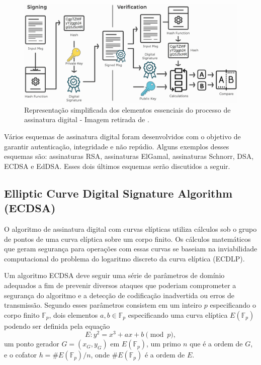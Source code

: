 \begin{figure}[h]
	\centering
	\includegraphics[keepaspectratio=true,scale=0.45]{figuras/assinatura digital.png}
	\caption{Representação simplificada dos elementos essenciais do processo de assinatura digital - Imagem retirada de \cite{nakov2018}.}
	\label{assinaturaDigitalSimp}
\end{figure}

Vários esquemas de assinatura digital foram desenvolvidos com o objetivo de garantir autenticação, integridade e não repúdio. Alguns exemplos desses esquemas são: assinaturas RSA, assinaturas ElGamal, assinaturas Schnorr, DSA, ECDSA e EdDSA. Esses dois últimos esquemas serão discutidos a seguir.

\subsection{Elliptic Curve Digital Signature Algorithm (ECDSA)}

O algoritmo de assinatura digital com curvas elípticas utiliza cálculos sob o grupo de pontos de uma curva elíptica sobre um corpo finito. Os cálculos matemáticos que geram segurança para operações com essas curvas se baseiam na inviabilidade computacional do problema do logaritmo discreto da curva elíptica (ECDLP).

Um algoritmo ECDSA deve seguir uma série de parâmetros de domínio adequados a fim de prevenir diversos ataques que poderiam comprometer a segurança do algoritmo e a detecção de codificação inadvertida ou erros de transmissão. Segundo  esses parâmetros consistem em um inteiro $p$ especificando o corpo finito $\mathbb{F}_p$, dois elementos $a, b \in \mathbb{F}_p $ especificando uma curva elíptica $E(\mathbb{F}_p)$ podendo ser definida pela equação
\begin{equation}
E : y^2 = x^3 + ax + b \pmod{p},
\end{equation}
um ponto gerador $G = (x_G, y_G)$ em $E(\mathbb{F}_p)$, um primo $n$ que é a ordem de $G$, e o cofator $h = \#E(\mathbb{F}_p) / n$, onde $\#E(\mathbb{F}_p)$ é a ordem de $E$.

